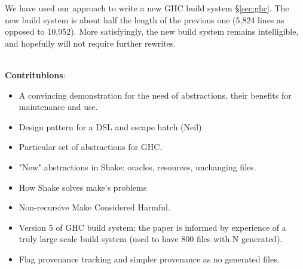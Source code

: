 We have used our approach to write a new GHC build system \S\ref{sec:ghc}. The
new build system is about half the length of the previous one (5,824 lines as
opposed to 10,952).  More satisfyingly,
the new build system remains intelligible, and hopefully will not require
further rewrites.



~\\
\textbf{Contritubions}:
\begin{itemize}
  \item A convincing demonstration for the need of abstractions,
  their benefits for maintenance and use.
  \item Design pattern for a DSL and escape hatch (Neil)
  \item Particular set of abstractions for GHC.
  \item "New" abstractions in Shake: oracles, resources, unchanging files.
  \item How Shake solves make's problems
  \item Non-recursive Make Considered Harmful.
  \item Version 5 of GHC build system; the paper is informed by
  experience of a truly large scale build system (used to 
  have 800 files with N generated).
  \item Flag provenance tracking and simpler provenance as no
  generated files. 
\end{itemize}
